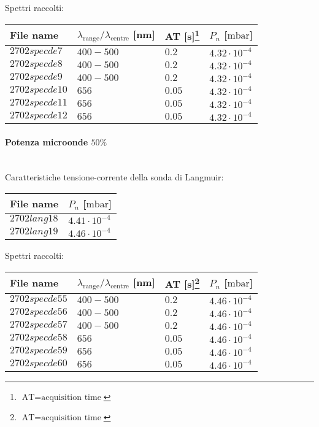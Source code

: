 Spettri raccolti:
\begin{center}
\begin{tabular}{p{3cm}p{4cm}p{2cm}p{3cm}}
\toprule
File name	&$\lambda_\text{range}\text{/}\lambda_\text{centre}$ [nm] 	&AT [s]\footnote{$\text{AT}=\text{acquisition time}$} &$P_n$ [$\si{\milli\bar}$]\\
\midrule
$2702specde7$	&$400-500$	&$0.2$		&$4.32\cdot10^{-4}$\\
$2702specde8$	&$400-500$	&$0.2$		&$4.32\cdot10^{-4}$\\
$2702specde9$	&$400-500$	&$0.2$		&$4.32\cdot10^{-4}$\\
$2702specde10$	&$656$		&$0.05$		&$4.32\cdot10^{-4}$\\
$2702specde11$	&$656$		&$0.05$		&$4.32\cdot10^{-4}$\\
$2702specde12$	&$656$		&$0.05$		&$4.32\cdot10^{-4}$\\
\bottomrule
\end{tabular}
\end{center}

\paragraph*{Potenza microonde $\text{50\%}$} ~\\
Caratteristiche tensione-corrente della sonda di Langmuir:
\begin{center}
\begin{tabular}{p{3cm}p{3cm}}
\toprule
File name	&$P_n$ [$\si{\milli\bar}$]\\
\midrule
$2702lang18$	&$4.41\cdot10^{-4}$\\
$2702lang19$	&$4.46\cdot10^{-4}$\\
\bottomrule
\end{tabular}
\end{center}

Spettri raccolti:
\begin{center}
\begin{tabular}{p{3cm}p{4cm}p{2cm}p{3cm}}
\toprule
File name	&$\lambda_\text{range}\text{/}\lambda_\text{centre}$ [nm] 	&AT [s]\footnote{$\text{AT}=\text{acquisition time}$} &$P_n$ [$\si{\milli\bar}$]\\
\midrule
$2702specde55$	&$400-500$	&$0.2$		&$4.46\cdot10^{-4}$\\
$2702specde56$	&$400-500$	&$0.2$		&$4.46\cdot10^{-4}$\\
$2702specde57$	&$400-500$	&$0.2$		&$4.46\cdot10^{-4}$\\
$2702specde58$	&$656$		&$0.05$		&$4.46\cdot10^{-4}$\\
$2702specde59$	&$656$		&$0.05$		&$4.46\cdot10^{-4}$\\
$2702specde60$	&$656$		&$0.05$		&$4.46\cdot10^{-4}$\\
\bottomrule
\end{tabular}
\end{center}

